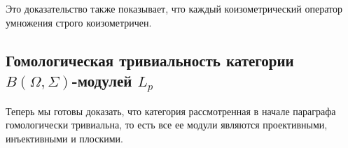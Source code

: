 Это доказательство также показывает, что каждый коизометрический оператор
умножения строго коизометричен.




\subsection{Гомологическая тривиальность категории
    \texorpdfstring{$B(\Omega,\Sigma)$-модулей $L_p$}{B (Omega)-модулей Lp}
}\label{
    SubSectionHomologicalTrivialityOfTheCategoryBOmegaSigmaModulesLp}

Теперь мы готовы доказать, что категория рассмотренная в начале параграфа
гомологически тривиальна, то есть все ее модули являются проективными,
инъективными и плоскими.

